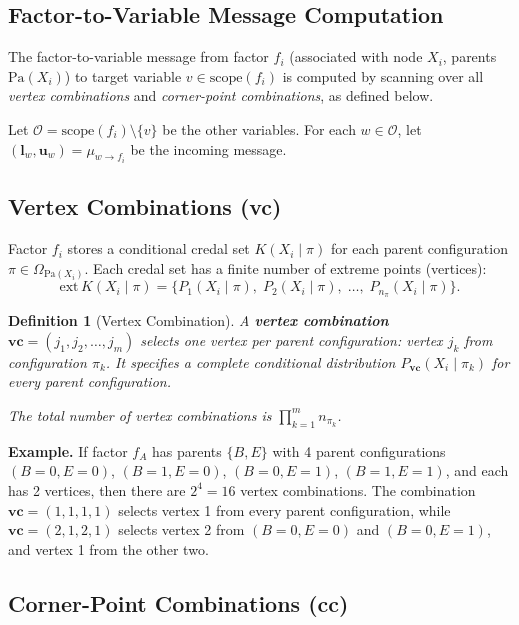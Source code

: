 \documentclass{article}
\newtheorem{definition}{Definition}
\begin{document}
\subsection{Factor-to-Variable Message Computation}\label{sec:ftov}

The factor-to-variable message from factor $f_i$ (associated with node $X_i$,
parents $\mathrm{Pa}(X_i)$) to target variable $v \in \mathrm{scope}(f_i)$
is computed by scanning over all \emph{vertex combinations} and
\emph{corner-point combinations}, as defined below.

Let $\mathcal{O} = \mathrm{scope}(f_i) \setminus \{v\}$ be the other variables.
For each $w \in \mathcal{O}$, let $(\mathbf{l}_{w}, \mathbf{u}_{w}) = \mu_{w \to f_i}$ be the incoming message.

\subsection{Vertex Combinations (vc)}\label{sec:vc}

Factor $f_i$ stores a conditional credal set $K(X_i \mid \pi)$ for each parent
configuration $\pi \in \Omega_{\mathrm{Pa}(X_i)}$. Each credal set has a finite
number of extreme points (vertices):
\[
  \mathrm{ext}\,K(X_i \mid \pi) = \{P_1(X_i \mid \pi),\; P_2(X_i \mid \pi),\; \dots,\; P_{n_\pi}(X_i \mid \pi)\}.
\]

\begin{definition}[Vertex Combination]
A \textbf{vertex combination} $\mathbf{vc} = (j_1, j_2, \dots, j_m)$ selects one vertex per parent
configuration: vertex $j_k$ from configuration $\pi_k$. It specifies a complete conditional
distribution $P_{\mathbf{vc}}(X_i \mid \pi_k)$ for every parent configuration.

The total number of vertex combinations is $\prod_{k=1}^{m} n_{\pi_k}$.
\end{definition}

\textbf{Example.} If factor $f_A$ has parents $\{B, E\}$ with 4 parent configurations
$(B{=}0,E{=}0)$, $(B{=}1,E{=}0)$, $(B{=}0,E{=}1)$, $(B{=}1,E{=}1)$, and each has
2 vertices, then there are $2^4 = 16$ vertex combinations. The combination $\mathbf{vc} = (1,1,1,1)$
selects vertex 1 from every parent configuration, while $\mathbf{vc} = (2,1,2,1)$ selects vertex 2
from $(B{=}0,E{=}0)$ and $(B{=}0,E{=}1)$, and vertex 1 from the other two.

\subsection{Corner-Point Combinations (cc)}\label{sec:cc}
\end{document}
